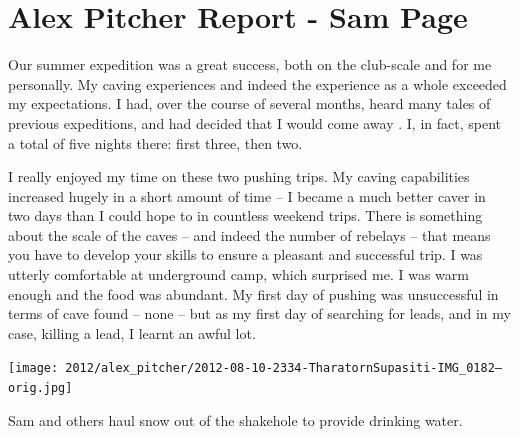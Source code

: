 \section{Alex Pitcher Report - Sam Page}


Our summer expedition was a great success, both on the club-scale and for me personally. My caving experiences and indeed the experience as a whole exceeded my expectations. I had, over the course of several months, heard many tales of previous expeditions, and had decided that I would come away . I, in fact, spent a total of five nights there: first three, then two.


I really enjoyed my time on these two pushing trips. My caving capabilities increased hugely in a short amount of time – I became a much better caver in two days than I could hope to in countless weekend trips. There is something about the scale of the caves – and indeed the number of rebelays – that means you have to develop your skills to ensure a pleasant and successful trip. I was utterly comfortable at underground camp, which surprised me. I was warm enough and the food was abundant. My first day of pushing was unsuccessful in terms of cave found – none – but as my first day of searching for leads, and in my case, killing a lead, I learnt an awful lot.

\begin{pagefigure}
\checkoddpage \ifoddpage \forcerectofloat \else \forceversofloat \fi
   \centering
\texttt{[image: 2012/alex\_pitcher/2012-08-10-2334-TharatornSupasiti-IMG\_0182--orig.jpg]}
\caption{Sam and others haul snow out of the  shakehole to provide drinking water. } \label{m10 haul}
\end{pagefigure}


